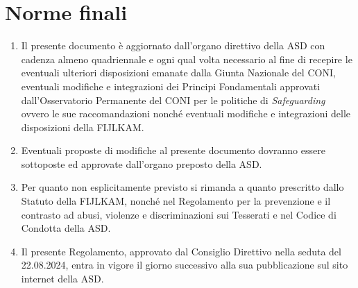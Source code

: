 \documentclass{djtsdoc}
\begin{document}
	\section{Norme finali}
	\begin{enumerate}
		\item Il presente documento è aggiornato dall'organo direttivo della ASD con cadenza almeno quadriennale e ogni qual volta necessario al fine di recepire le eventuali ulteriori disposizioni emanate dalla Giunta Nazionale del CONI, eventuali modifiche e integrazioni dei Principi Fondamentali approvati dall'Osservatorio Permanente del CONI per le politiche di \textit{Safeguarding} ovvero le sue raccomandazioni nonché eventuali modifiche e integrazioni delle disposizioni della FIJLKAM.
		\item Eventuali proposte di modifiche al presente documento dovranno essere sottoposte ed approvate dall'organo preposto della ASD.
		\item Per quanto non esplicitamente previsto si rimanda a quanto prescritto dallo Statuto della FIJLKAM, nonché nel Regolamento per la prevenzione e il contrasto ad abusi, violenze e discriminazioni sui Tesserati e nel Codice di Condotta della ASD.
		\item Il presente Regolamento, approvato dal Consiglio Direttivo nella seduta del 22.08.2024, entra in vigore il giorno successivo alla sua pubblicazione sul sito internet della ASD.
	\end{enumerate}
	
\end{document}
